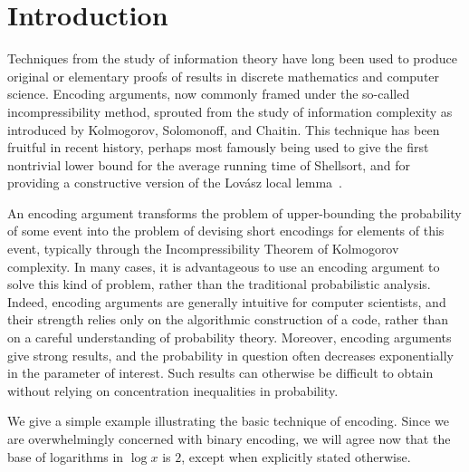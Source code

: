 \chapter{Introduction}

Techniques from the study of information theory have long been used to
produce original or elementary proofs of results in discrete
mathematics and computer science. Encoding arguments, now commonly
framed under the so-called incompressibility method, sprouted from the
study of information complexity as introduced by Kolmogorov,
Solomonoff, and Chaitin. This technique has been fruitful in recent
history, perhaps most famously being used to give the first nontrivial
lower bound for the average running time of Shellsort, and for
providing a constructive version of the Lov\'{a}sz local
lemma~\cite{buhrman:applications, buhrman:applications2,
  jiang.li.vitanyi:shellsort, moser:locallemma, vitanyi:analysis}.

An encoding argument transforms the problem of upper-bounding the
probability of some event into the problem of devising short encodings
for elements of this event, typically through the Incompressibility
Theorem of Kolmogorov complexity. In many cases, it is advantageous to
use an encoding argument to solve this kind of problem, rather than
the traditional probabilistic analysis. Indeed, encoding arguments are
generally intuitive for computer scientists, and their strength relies
only on the algorithmic construction of a code, rather than on a
careful understanding of probability theory. Moreover, encoding
arguments give strong results, and the probability in question often
decreases exponentially in the parameter of interest. Such results can
otherwise be difficult to obtain without relying on concentration
inequalities in probability.

We give a simple example illustrating the basic technique of
encoding. Since we are overwhelmingly concerned with binary encoding,
we will agree now that the base of logarithms in $\log x$ is $2$,
except when explicitly stated otherwise.

